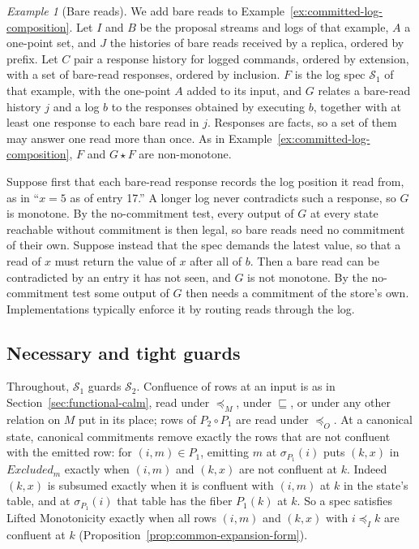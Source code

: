 \documentclass[sigconf]{cidr-2027}
\theoremstyle{remark}
\newtheorem{example}{Example}
\newcommand{\InputOrd}{\preceq_I}
\newcommand{\OutputOrd}{\preceq_O}
\newcommand{\commitment}{commitment\xspace}
\newcommand{\commitments}{commitments\xspace}
\newcommand{\Spec}{\mathcal{S}}
\newcommand{\Excluded}{\mathit{Excluded}}
\begin{document}
\begin{example}[Bare reads]
\label{ex:bare-reads}
We add bare reads to Example~\ref{ex:committed-log-composition}. Let $I$
and $B$ be the proposal streams and logs of that example, $A$ a one-point set,
and $J$ the histories of bare reads received by a replica, ordered by prefix. Let $C$ pair a response history for logged commands, ordered by extension,
with a set of bare-read responses, ordered by inclusion. $F$ is the log spec
$\Spec_1$ of that example, with the one-point $A$ added to its input, and $G$
relates a bare-read history $j$ and a log $b$ to the responses
obtained by executing $b$, together with at least one response to each bare
read in $j$. Responses are facts, so a set of them may answer one read more
than once. As in Example~\ref{ex:committed-log-composition}, $F$ and
$G\star F$ are non-monotone.

Suppose first that each bare-read response records the log position it read
from, as in ``$x=5$ as of entry 17.''  A longer log never contradicts such a
response, so $G$ is monotone. By the no-\commitment test, every output of
$G$ at every state reachable without \commitment is then legal, so bare reads
need no \commitment of their own. Suppose instead that the spec
demands the latest value, so that a read of $x$ must return the value of $x$
after all of $b$. Then a bare read can be contradicted by an entry it has not
seen, and $G$ is not monotone. By the no-\commitment test some output of $G$
then needs a \commitment of the store's own. Implementations typically
enforce it by routing reads through the log.
\end{example}

\subsection{Necessary and tight guards}
\label{app:tight}

Throughout, $\Spec_1$ guards $\Spec_2$. Confluence of rows at an input is
as in Section~\ref{sec:functional-calm}, read under $\preceq_M$, under
$\sqsubseteq$, or under any other relation on $M$ put in its place; rows of
$P_2\circ P_1$ are read under $\OutputOrd$. At a canonical state, canonical
\commitments remove exactly the rows that are not confluent with the emitted row: for
$(i,m)\in P_1$, emitting $m$ at $\sigma_{P_1}(i)$ puts $(k,x)$ in
$\Excluded_m$ exactly when $(i,m)$ and $(k,x)$ are not confluent at $k$. Indeed $(k,x)$ is subsumed exactly when it is confluent with $(i,m)$ at $k$
in the state's table, and at $\sigma_{P_1}(i)$ that table has the fiber
$P_1(k)$ at $k$. So a spec satisfies Lifted Monotonicity exactly when all rows $(i,m)$ and $(k,x)$ with $i\InputOrd k$ are confluent at $k$
(Proposition~\ref{prop:common-expansion-form}).
\end{document}
